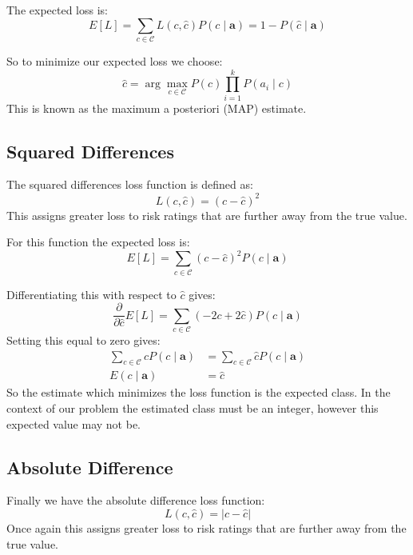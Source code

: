The expected loss is:
\begin{equation}
	E[L] = \sum_{c \in \mathcal{C}} L(c, \hat{c})P(c \mid \mathbf{a}) = 1 - P(\hat{c} \mid \mathbf{a})
\end{equation}

So to minimize our expected loss we choose:
\begin{equation}\label{map}
	\hat c = \arg\max_{c \in \mathcal{C}} P(c)\prod_{i=1}^{k}P(a_i \mid c)
\end{equation}
This is known as the maximum a posteriori (MAP) estimate.

\subsection{Squared Differences}
The squared differences loss function is defined as:
\begin{equation}
	L(c, \hat{c}) = (c - \hat{c})^2
\end{equation}
This assigns greater loss to risk ratings that are further away from the true value.

For this function the expected loss is:
\begin{equation}
	E[L] = \sum_{c \in \mathcal{C}} (c - \hat{c})^2P(c \mid \mathbf{a}) 
\end{equation}

Differentiating this with respect to $\hat{c}$ gives:
\begin{equation}
	\frac{\partial}{\partial \hat{c}} E[L] = \sum_{c \in \mathcal{C}} (-2c + 2\hat{c})P(c \mid \mathbf{a}) 
\end{equation}
Setting this equal to zero gives:
\begin{align}
	\sum_{c \in \mathcal{C}} cP(c \mid \mathbf{a}) & = \sum_{c \in \mathcal{C}} \hat{c}P(c \mid \mathbf{a}) \\
	E(c \mid \mathbf{a}) & = \hat{c}
\end{align}
So the estimate which minimizes the loss function is the expected class.
In the context of our problem the estimated class must be an integer, however this expected value may not be.

\subsection{Absolute Difference}
Finally we have the absolute difference loss function:
\begin{equation}
	L(c, \hat{c}) = | c - \hat{c} |
\end{equation}
Once again this assigns greater loss to risk ratings that are further away from the true value.

